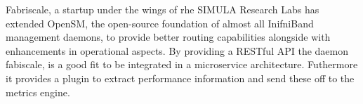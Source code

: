 Fabriscale, a startup under the wings of rhe SIMULA Research Labs has extended OpenSM, the open-source foundation of
almost all InifniBand management daemons, to provide better routing capabilities alongside with enhancements in operational aspects.
By providing a RESTful API the daemon fabiscale, is a good fit to be integrated in a microservice architecture. Futhermore it
provides a plugin to extract performance information and send these off to the metrics engine.
